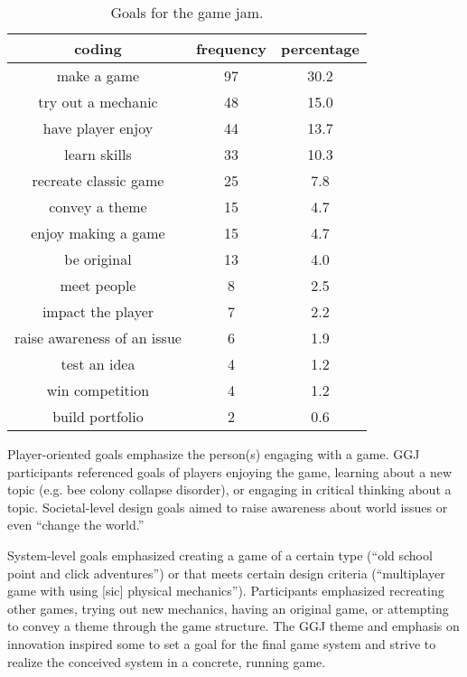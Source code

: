 \documentclass{sig-alternate}
\begin{document}
\begin{table}[tb]
\centering
\scriptsize
\begin{tabular}{|c|c|c|}
\hline coding & frequency & percentage \\ 
\hline make a game & 97 & 30.2 \\ 
\hline try out a mechanic & 48 & 15.0 \\ 
\hline have player enjoy & 44 & 13.7 \\ 
\hline learn skills & 33 & 10.3 \\ 
\hline recreate classic game & 25 & 7.8 \\ 
\hline convey a theme & 15 & 4.7 \\ 
\hline enjoy making a game & 15 & 4.7 \\ 
\hline be original & 13 & 4.0 \\ 
\hline meet people & 8 & 2.5 \\ 
\hline impact the player & 7 & 2.2 \\ 
\hline raise awareness of an issue & 6 & 1.9 \\ 
\hline test an idea & 4 & 1.2 \\ 
\hline win competition & 4 & 1.2 \\ 
\hline build portfolio & 2 & 0.6 \\ 
\hline 
\end{tabular} 
\caption{Goals for the game jam.}
\label{tab:goals}
\end{table}

Player-oriented goals emphasize the person(s) engaging with a game.
GGJ participants referenced goals of players enjoying the game, learning about a new topic (e.g. bee colony collapse disorder), or engaging in critical thinking about a topic. Societal-level design goals aimed to raise awareness about world issues or even ``change the world.''

System-level goals emphasized creating a game of a certain type (``old school point and click adventures'') or that meets certain design criteria (``multiplayer game with using [sic] physical mechanics''). Participants emphasized recreating other games, trying out new mechanics, having an original game, or attempting to convey a theme through the game structure. The GGJ theme and emphasis on innovation inspired some to set a goal for the final game system and strive to realize the conceived system in a concrete, running game.
\end{document}
